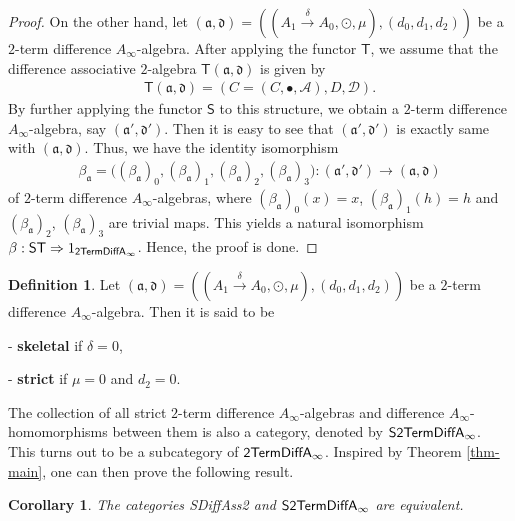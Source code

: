 \documentclass[a4paper,reqno,10pt]{amsart}
\theoremstyle{plain}
\newtheorem{corollary}[thm]{Corollary}
\theoremstyle{definition}
\newtheorem{defn}[thm]{Definition}
\theoremstyle{remark}
\begin{document}
\begin{proof}
On the other hand, let $(\mathfrak{a}, \mathfrak{d}) = ((A_1 \xrightarrow{\delta} A_0, \odot, \mu ), (d_0, d_1, d_2) )$ be a $2$-term difference $A_\infty$-algebra. After applying the functor $\mathsf{T}$, we assume that the difference associative $2$-algebra $\mathsf{T} (\mathfrak{a}, \mathfrak{d})$ is given by
\begin{align*}
    \mathsf{T} (\mathfrak{a}, \mathfrak{d}) = (C = (C, \bullet, \mathcal{A}), D, \mathcal{D}).
\end{align*}
By further applying the functor $\mathsf{S}$ to this structure, we obtain a $2$-term difference $A_\infty$-algebra, say $(\mathfrak{a}', \mathfrak{d}')$. Then it is easy to see that $(\mathfrak{a}', \mathfrak{d}')$ is exactly same with $(\mathfrak{a}, \mathfrak{d})$. Thus, we have the identity isomorphism
\begin{align*}
    \beta_\mathfrak{a} = \big( (\beta_\mathfrak{a})_0, (\beta_\mathfrak{a})_1, (\beta_\mathfrak{a})_2, (\beta_\mathfrak{a})_3 \big) : (\mathfrak{a}', \mathfrak{d}') \rightarrow (\mathfrak{a}, \mathfrak{d})
\end{align*}
of $2$-term difference $A_\infty$-algebras, where $(\beta_\mathfrak{a})_0 (x) = x$, $(\beta_\mathfrak{a})_1 (h) = h$ and $(\beta_\mathfrak{a})_2$, $(\beta_\mathfrak{a})_3$ are trivial maps. This yields a natural isomorphism $\beta: {\sf ST} \Rightarrow 1_{\sf 2TermDiffA_\infty }$. Hence, the proof is done.
\end{proof}

\medskip

\begin{defn}\label{defi-sk-st}
Let $(\mathfrak{a}, \mathfrak{d}) = (( A_1 \xrightarrow{ \delta} A_0, \odot, \mu ) , (d_0, d_1, d_2) )$ be a $2$-term difference $A_\infty$-algebra. Then it is said to be 

- {\bf skeletal} if $\delta = 0$,

- {\bf strict} if $\mu = 0$ and $d_2 = 0$.
\end{defn}
\noindent The collection of all strict $2$-term difference $A_\infty$-algebras and difference $A_\infty$-homomorphisms between them is also a category, denoted by ${\sf S2TermDiffA_\infty }$. This turns out to be a subcategory of  ${\sf 2TermDiffA_\infty }$. Inspired by Theorem \ref{thm-main}, one can then prove the following result.

\begin{corollary}\label{cor-main}
The categories {\sf SDiffAss2} and ${\sf S2TermDiffA_\infty }$ are equivalent.
\end{corollary}
\end{document}
